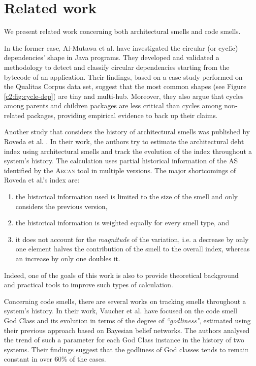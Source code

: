 \section{Related work}\label{c2:sec:related-work}
We present related work concerning both architectural smells and code smells.

In the former case, Al-Mutawa et al. \cite{AlMutawa2014} have investigated the circular (or cyclic) dependencies' shape in Java programs. 
They developed and validated a methodology to detect and classify circular dependencies starting from the bytecode of an application.
Their findings, based on a case study performed on the Qualitas Corpus \cite{QualitasCorpus2010} data set, suggest that the most common shapes (see Figure \ref{c2:fig:cycle-dep}) are tiny and multi-hub. Moreover, they also argue that cycles among parents and children packages are less critical than cycles among non-related packages, providing empirical evidence to back up their claims.

Another study that considers the history of architectural smells was published by Roveda et al. \cite{Roveda2018}.
In their work, the authors try to estimate the architectural debt index using architectural smells and track the evolution of the index throughout a system's history.
The calculation uses partial historical information of the AS identified by the \textsc{Arcan} tool in multiple versions.
The major shortcomings of Roveda et al.'s index are:
\begin{enumerate}[label=(\roman*)]
    \item the historical information used is limited to the size of the smell and only considers the previous version,
    \item the historical information is weighted equally for every smell type, and
    \item it does not account for the \emph{magnitude} of the variation, i.e. a decrease by only one element halves the contribution of the smell to the overall index, whereas an increase by only one doubles it.
\end{enumerate}
Indeed, one of the goals of this work is also to provide theoretical background and practical tools to improve such types of calculation.

Concerning code smells, there are several works on tracking smells throughout a system's history.
In their work, Vaucher et al. \cite{Vaucher2009} have focused on the code smell God Class and its evolution in terms of the degree of \textit{``godliness"}, estimated using their previous approach based on Bayesian belief networks.
The authors analysed the trend of such a parameter for each God Class instance in the history of two systems. Their findings suggest that the godliness of God classes tends to remain constant in over 60\% of the cases.

